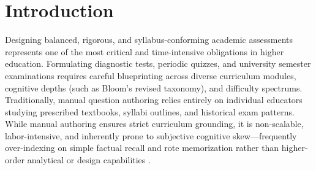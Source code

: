 \documentclass[conference]{IEEEtran}
\begin{document}
\section{Introduction}
Designing balanced, rigorous, and syllabus-conforming academic assessments represents one of the most critical and time-intensive obligations in higher education. Formulating diagnostic tests, periodic quizzes, and university semester examinations requires careful blueprinting across diverse curriculum modules, cognitive depths (such as Bloom's revised taxonomy), and difficulty spectrums. Traditionally, manual question authoring relies entirely on individual educators studying prescribed textbooks, syllabi outlines, and historical exam patterns. While manual authoring ensures strict curriculum grounding, it is non-scalable, labor-intensive, and inherently prone to subjective cognitive skew---frequently over-indexing on simple factual recall and rote memorization rather than higher-order analytical or design capabilities \cite{elkins2024teachers, scaria2024modern}.
\end{document}
